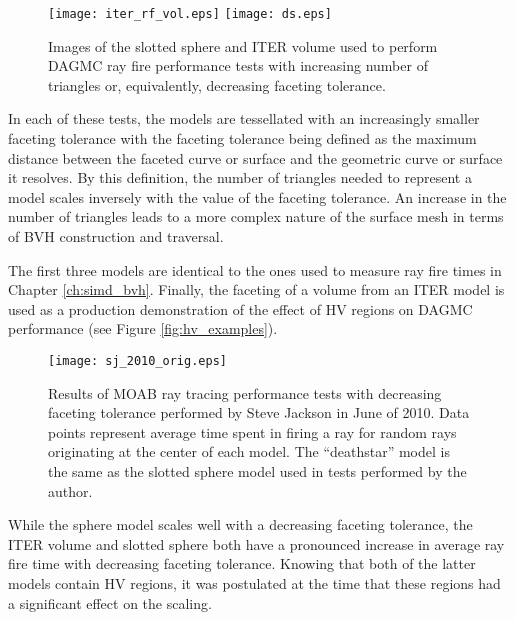 \begin{figure}[H]
  \centering
    \texttt{[image: iter\_rf\_vol.eps]}
    \texttt{[image: ds.eps]}
  \caption[CAD models used in ray fire timing.]{Images of the slotted sphere and
    ITER volume used to perform DAGMC ray fire performance tests with increasing
    number of triangles or, equivalently, decreasing faceting tolerance.}
  \label{fig:sj_hv_test_models}
\end{figure} 

In each of these tests, the models are tessellated with an increasingly smaller
faceting tolerance with the faceting tolerance being defined as the maximum
distance between the faceted curve or surface and the geometric curve or surface
it resolves. By this definition, the number of triangles needed to represent a
model scales inversely with the value of the faceting tolerance. An increase in
the number of triangles leads to a more complex nature of the surface mesh in
terms of BVH construction and traversal.

The first three models are identical to the ones used to measure ray fire times
in Chapter \ref{ch:simd_bvh}. Finally, the faceting of a volume from an ITER
model is used as a production demonstration of the effect of HV
regions on DAGMC performance (see Figure \ref{fig:hv_examples}).

\begin{figure}[H]
  \centering
  \begin{center}
    \texttt{[image: sj\_2010\_orig.eps]} \\
    \caption[Previous results of ray fire timings from 2010.]{Results of MOAB
      ray tracing performance tests with decreasing faceting tolerance performed
      by Steve Jackson in June of 2010. Data points represent average time spent
      in firing a ray for random rays originating at the center of each
      model\cite{Tautges_2009}. The ``deathstar'' model is the same as the
      slotted sphere model used in tests performed by the author.}
    \label{fig:sj_hv_test_results}
  \end{center}
\end{figure}

While the sphere model scales well with a decreasing faceting tolerance, the
ITER volume and slotted sphere both have a pronounced increase in average ray
fire time with decreasing faceting tolerance. Knowing that both of the latter
models contain HV regions, it was postulated at the time that these
regions had a significant effect on the scaling.

